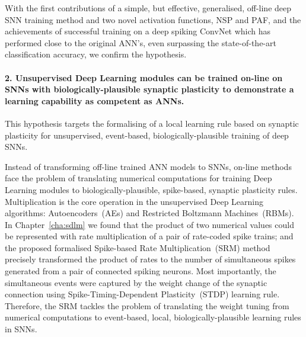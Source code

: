 With the first contributions of a simple, but effective, generalised, off-line deep SNN training method and two novel activation functions, NSP and PAF, and the achievements of successful training on a deep spiking ConvNet which has performed close to the original ANN's, even surpassing the state-of-the-art classification accuracy, we confirm the hypothesis.

\paragraph{2. Unsupervised Deep Learning modules can be trained on-line on SNNs with biologically-plausible synaptic plasticity to demonstrate a learning capability as competent as ANNs.}
This hypothesis targets the formalising of a local learning rule based on synaptic plasticity for unsupervised, event-based, biologically-plausible training of deep SNNs. %


Instead of transforming off-line trained ANN models to SNNs, on-line methods face the problem of translating numerical computations for training Deep Learning modules to biologically-plausible, spike-based, synaptic plasticity rules.
Multiplication is the core operation in the unsupervised Deep Learning algorithms: Autoencoders~(AEs) and Restricted Boltzmann Machines~(RBMs).
In Chapter~\ref{cha:sdlm} we found that the product of two numerical values could be represented with rate multiplication of a pair of rate-coded spike trains;
and the proposed formalised Spike-based Rate Multiplication~(SRM) method precisely transformed the product of rates to the number of simultaneous spikes generated from a pair of connected spiking neurons.
Most importantly, the simultaneous events were captured by the weight change of the synaptic connection using Spike-Timing-Dependent Plasticity~(STDP) learning rule.
Therefore, the SRM tackles the problem of translating the weight tuning from numerical computations to event-based, local, biologically-plausible learning rules in SNNs.

